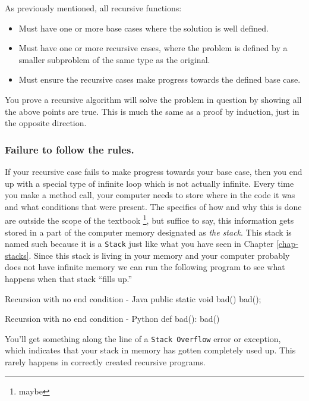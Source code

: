 As previously mentioned, all recursive functions:
\begin{itemize}
	\item Must have one or more base cases where the solution is well defined.
	\item Must have one or more recursive cases, where the problem is defined by a smaller subproblem of the same type as the original.
	\item Must ensure the recursive cases make progress towards the defined base case.
\end{itemize}


You prove a recursive algorithm will solve the problem in question by showing all the above points are true.  
This is much the same as a proof by induction, just in the opposite direction.

\subsubsection{Failure to follow the rules.}

If your recursive case fails to make progress towards your base case, then you end up with a special type of infinite loop which is not actually infinite.  Every time you make a method call,  your computer needs to store where in the code it was and what conditions that were present.  The specifics of how and why this is done are outside the scope of the textbook \footnote{maybe}, but suffice to say, this information gets stored in a part of the computer memory designated as \textit{the stack}.  This stack is named such because it is a \texttt{Stack} just like what you have seen in Chapter \ref{chap-stacks}.  Since this stack is living in your memory and your computer probably does not have infinite memory  we can run the following program to see what happens when that stack ``fills up.''

\begin{javacode}{Recursion with no end condition - Java}
public static void bad(){
	bad();
}
\end{javacode}


\begin{pycode}{Recursion with no end condition - Python}
def bad():
	bad()
\end{pycode}

You'll get something along the line of a \texttt{Stack Overflow} error or exception, which indicates that your stack in memory has gotten completely used up.  This rarely happens in correctly created recursive programs.

